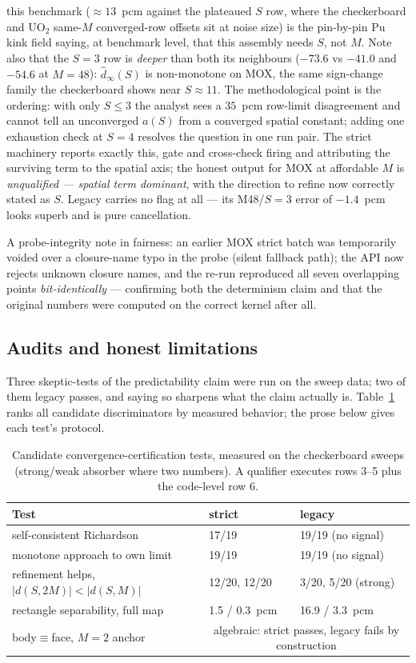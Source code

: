 \documentclass[11pt,a4paper]{article}
\begin{document}
this benchmark ($\approx$$13$~pcm against the plateaued $S$ row,
where the checkerboard and UO$_2$ same-$M$ converged-row offsets
sit at noise size) is the pin-by-pin Pu kink field saying, at
benchmark level, that this assembly needs $S$, not $M$.  Note also that the $S{=}3$ row is \emph{deeper}
than both its neighbours ($-73.6$ vs $-41.0$ and $-54.6$ at
$M{=}48$): $\hat d_\infty(S)$ is non-monotone on MOX, the same
sign-change family the checkerboard shows near $S\approx11$.  The
methodological point is the ordering: with only $S\le3$ the analyst
sees a $35$~pcm row-limit disagreement and cannot tell an
unconverged $a(S)$ from a converged spatial constant; adding one
exhaustion check at $S{=}4$ resolves the question in one run pair.
The strict machinery reports exactly this, gate and cross-check
firing and attributing the surviving term to the spatial axis; the
honest output for MOX at affordable $M$ is \emph{unqualified ---
spatial term dominant}, with the direction to refine now correctly
stated as $S$.
Legacy carries no flag at
all --- its M48/$S{=}3$ error of $-1.4$~pcm looks superb and is pure
cancellation.

A probe-integrity note in fairness: an earlier MOX strict batch was
temporarily voided over a closure-name typo in the probe (silent
fallback path); the API now rejects unknown closure names, and the
re-run reproduced all seven overlapping points \emph{bit-identically}
--- confirming both the determinism claim and that the original
numbers were computed on the correct kernel after all.

\subsection{Audits and honest limitations}
\label{sec:audit}
Three skeptic-tests of the predictability claim were run on the
sweep data; two of them legacy passes, and saying so sharpens what
the claim actually is.  Table~\ref{tab:tests} ranks all candidate
discriminators by measured behavior; the prose below gives each
test's protocol.

\begin{table}[t]
\centering
\caption{Candidate convergence-certification tests, measured on the
checkerboard sweeps (strong/weak absorber where two numbers). A
qualifier executes rows 3--5 plus the code-level row 6.}
\label{tab:tests}
\begin{tabular}{lll}
\toprule
Test & strict & legacy \\
\midrule
self-consistent Richardson & 17/19 & 19/19 (no signal) \\
monotone approach to own limit & 19/19 & 19/19 (no signal) \\
refinement helps, $|d(S,2M)|<|d(S,M)|$ & 12/20, 12/20 & 3/20, 5/20 (strong) \\
rectangle separability, full map & 1.5 / 0.3~pcm & 16.9 / 3.3~pcm \\
body$\equiv$face, $M{=}2$ anchor & \multicolumn{2}{c}{algebraic: strict passes, legacy fails by construction} \\
\bottomrule
\end{tabular}
\end{table}
\end{document}
